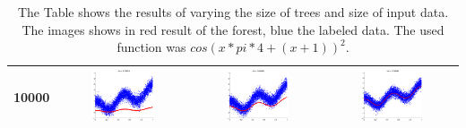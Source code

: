 \begin{landscape}
\begin{table}[p]
\begin{tabular}{|c|c|c|c|}
10000& \includegraphics[width=0.5\textwidth, height=0.35\textheight]{fig/cos_10k_50} & \includegraphics[width=0.5\textwidth, height=0.35\textheight]{fig/cos_10k_150} & \includegraphics[width=0.5\textwidth, height=0.35\textheight]{fig/cos_10k_1500} \\ \hline
\bottomrule
\end{tabular}
\caption{The Table shows the results of varying the size of trees and size of input data. The images shows in red result of the forest, blue the labeled data. The used function was $cos(x*pi*4 + (x+1))^2$.}
\label{tab:res_gen_cos}
\end{table}


\end{landscape}
